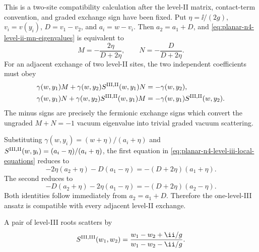 This is a two-site compatibility calculation after the level-II matrix,
contact-term convention, and graded exchange sign have been fixed.  Put
\(\eta=\ii/(2g)\), \(v_i=v(y_i)\), \(D=v_1-v_2\), and
\(a_i=w-v_i\).  Then \(a_2=a_1+D\), and
\eqref{eq:planar-n4-level-ii-mn-eigenvalues} is equivalent to
\[
  M=-\frac{2\eta}{D+2\eta},
  \qquad
  N=-\frac{D}{D+2\eta}.
\]
For an adjacent exchange of two level-II sites, the two independent
coefficients must obey
\begin{equation}
\begin{aligned}
  \gamma(w,y_1)M
  +\gamma(w,y_2)S^{{\rm III},{\rm II}}(w,y_1)N
  &=
  -\gamma(w,y_2),\\
  \gamma(w,y_1)N
  +\gamma(w,y_2)S^{{\rm III},{\rm II}}(w,y_1)M
  &=
  -\gamma(w,y_1)S^{{\rm III},{\rm II}}(w,y_2).
\end{aligned}
  \label{eq:planar-n4-level-iii-local-equations}
\end{equation}
The minus signs are precisely the fermionic exchange signs which convert the
ungraded \(M+N=-1\) vacuum eigenvalue into trivial graded vacuum scattering.

Substituting \(\gamma(w,y_i)=(w+\eta)/(a_i+\eta)\) and
\(S^{{\rm III},{\rm II}}(w,y_i)=(a_i-\eta)/(a_i+\eta)\), the first equation
in \eqref{eq:planar-n4-level-iii-local-equations} reduces to
\[
  -2\eta(a_2+\eta)-D(a_1-\eta)
  =
  -(D+2\eta)(a_1+\eta).
\]
The second reduces to
\[
  -D(a_2+\eta)-2\eta(a_1-\eta)
  =
  -(D+2\eta)(a_2-\eta).
\]
Both identities follow immediately from \(a_2=a_1+D\).  Therefore the
one-level-III ansatz is compatible with every adjacent level-II exchange.

A pair of level-III roots scatters by
\[
  S^{{\rm III},{\rm III}}(w_1,w_2)
  =
  \frac{w_1-w_2+\ii/g}{w_1-w_2-\ii/g}.
\]

